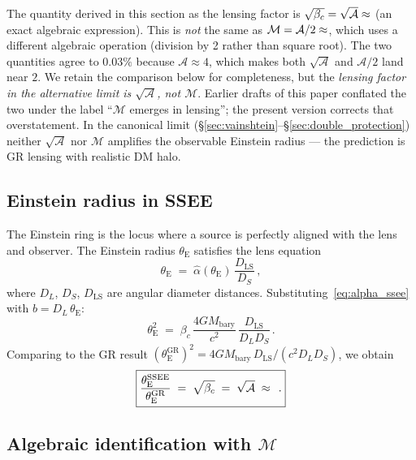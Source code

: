 \documentclass[12pt,a4paper]{article}
\newcommand{\MIRA}{\mathcal{M}}
\newcommand{\AURA}{\mathcal{A}}
\newcommand{\bc}{\beta_c}
\newcommand{\thetaE}{\theta_{\mathrm{E}}}
\newcommand{\hatalf}{\hat{\alpha}}
\begin{document}
\begin{tcolorbox}[colback=yellow!8,colframe=orange!60,title=Naming clarification]
The quantity derived in this section as the lensing factor is
$\sqrt{\bc}=\sqrt{\AURA}\approx \val{sqrt_AURA_d5}$ (an exact algebraic expression).
This is \emph{not} the same as $\MIRA=\AURA/2\approx \val{MIRA_d4}$, which uses a
different algebraic operation (division by 2 rather than square root). The
two quantities agree to $0.03\%$ because $\AURA\approx 4$, which makes both
$\sqrt{\AURA}$ and $\AURA/2$ land near $2$. We retain the comparison below
for completeness, but the \emph{lensing factor in the alternative limit is
$\sqrt{\AURA}$, not $\MIRA$}. Earlier drafts of this paper conflated the two
under the label ``$\MIRA$ emerges in lensing''; the present version corrects
that overstatement. In the canonical limit
(\S\ref{sec:vainshtein}--\S\ref{sec:double_protection}) neither $\sqrt{\AURA}$
nor $\MIRA$ amplifies the observable Einstein radius — the prediction is GR
lensing with realistic DM halo.
\end{tcolorbox}

\subsection{Einstein radius in SSEE}

The Einstein ring is the locus where a source is perfectly aligned with the
lens and observer.
The Einstein radius $\thetaE$ satisfies the lens equation
\begin{equation}
  \thetaE \;=\; \hatalf(\thetaE)\,\frac{D_{\mathrm{LS}}}{D_S}\,,
  \label{eq:lens_eq}
\end{equation}
where $D_L$, $D_S$, $D_{\mathrm{LS}}$ are angular diameter distances.
Substituting~\eqref{eq:alpha_ssee} with $b = D_L\,\thetaE$:
\begin{equation}
  \thetaE^2 \;=\; \bc\,\frac{4G M_{\mathrm{bary}}}{c^2}\,
                  \frac{D_{\mathrm{LS}}}{D_L D_S}\,.
  \label{eq:thetaE_ssee}
\end{equation}
Comparing to the GR result $(\thetaE^{\mathrm{GR}})^2 = 4GM_{\mathrm{bary}}\,
D_{\mathrm{LS}}/(c^2 D_L D_S)$, we obtain
\begin{equation}
  \boxed{\frac{\thetaE^{\mathrm{SSEE}}}{\thetaE^{\mathrm{GR}}}
         \;=\; \sqrt{\bc}
         \;=\; \sqrt{\AURA}
         \;\approx\; \val{sqrt_AURA_d4}\,.}
  \label{eq:thetaE_ratio}
\end{equation}

\subsection{Algebraic identification with \texorpdfstring{$\MIRA$}{M}}
\end{document}
